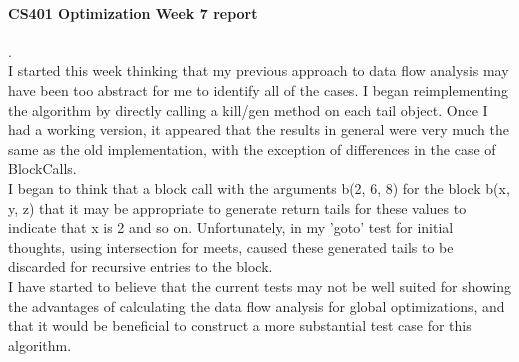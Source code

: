 \documentclass[14pt]{article}
\author{Joel Anna<annajoel@pdx.edu>}
\begin{document}
\paragraph{CS401 Optimization Week 7 report} 
.\\
I started this week thinking that my previous approach to data flow analysis may have been too abstract for me to identify all of the cases. I began reimplementing the algorithm by directly calling a kill/gen method on each tail object. Once I had a working version, it appeared that the results in general were very much the same as the old implementation, with the exception of differences in the case of BlockCalls.\\
I began to think that a block call with the arguments b(2, 6, 8) for the block b(x, y, z) that it may be appropriate to generate return tails for these values to indicate that x is 2 and so on. Unfortunately, in my 'goto' test for initial thoughts, using intersection for meets, caused these generated tails to be discarded for recursive entries to the block.\\
I have started to believe that the current tests may not be well suited for showing the advantages of calculating the data flow analysis for global optimizations, and that it would be beneficial to construct a more substantial test case for this algorithm.
\end{document}

